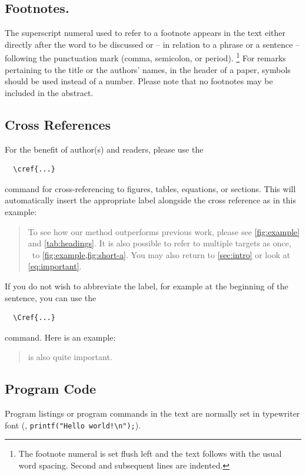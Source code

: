 \documentclass[runningheads]{llncs}
\begin{document}
\subsection{Footnotes.}
The superscript numeral used to refer to a footnote appears in the text either directly after the word to be discussed or -- in relation to a phrase or a sentence -- following the punctuation mark (comma, semicolon, or period).%
\footnote{The footnote numeral is set flush left and the text follows with the usual word spacing. 
  Second and subsequent lines are indented. 
}
For remarks pertaining to the title or the authors' names, in the header of a paper, symbols should be used instead of a number.
Please note that no footnotes may be included in the abstract.


\subsection{Cross References}
For the benefit of author(s) and readers, please use the
\begin{verbatim}
  \cref{...}
\end{verbatim}
command for cross-referencing to figures, tables, equations, or sections.
This will automatically insert the appropriate label alongside the cross reference as in this example:
\begin{quotation}
  To see how our method outperforms previous work, please see \cref{fig:example} and \cref{tab:headings}.
  It is also possible to refer to multiple targets as once, \eg~to \cref{fig:example,fig:short-a}.
  You may also return to \cref{sec:intro} or look at \cref{eq:important}.
\end{quotation}
If you do not wish to abbreviate the label, for example at the beginning of the sentence, you can use the
\begin{verbatim}
  \Cref{...}
\end{verbatim}
command. Here is an example:
\begin{quotation}
   is also quite important.
\end{quotation}


\subsection{Program Code}
Program listings or program commands in the text are normally set in typewriter font (\eg, \texttt{printf("Hello world!\textbackslash{}n");}).
\end{document}
